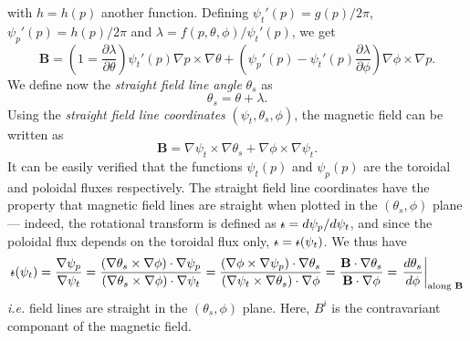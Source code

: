 with $h=h(p)$ another function. Defining $\psi_t'(p)=g(p)/2\pi$, $\psi_p'(p)=h(p)/2\pi$ and $\lambda=f(p,\theta,\phi)/\psi_t'(p)$, we get
\begin{equation}
	\mathbf{B} = \left(1=\frac{\partial\lambda}{\partial\theta}\right)\psi_t'(p)\nabla p\times\nabla\theta + \left(\psi_p'(p)-\psi_t'(p)\frac{\partial\lambda}{\partial\phi}\right)\nabla\phi\times\nabla p.
\end{equation}
We define now the \emph{straight field line angle} $\theta_s$ as 
\begin{equation}
	\theta_s = \theta + \lambda.
\end{equation}
Using the \emph{straight field line coordinates} $(\psi_t,\theta_s,\phi)$, the magnetic field can be written as
\begin{equation}
	\mathbf{B}=\nabla\psi_t\times\nabla\theta_s + \nabla\phi\times\nabla\psi_t. \label{eq.magnetic field covariant}
\end{equation}
It can be easily verified that the functions $\psi_t(p)$ and $\psi_p(p)$ are the toroidal and poloidal fluxes respectively. The straight field line coordinates have the property that magnetic field lines are straight when plotted in the $(\theta_s,\phi)$ plane --- indeed, the rotational transform is defined as $\text{$\iota\!\!$-}=d\psi_p/d\psi_t$, and since the poloidal flux depends on the toroidal flux only, $\text{$\iota\!\!$-}=\text{$\iota\!\!$-}(\psi_t)$. We thus have
\begin{equation}
	\text{$\iota\!\!$-}(\psi_t) = \frac{\nabla\psi_p}{\nabla\psi_t} = \frac{(\nabla\theta_s\times\nabla\phi)\cdot\nabla\psi_p}{(\nabla\theta_s\times\nabla\phi)\cdot\nabla\psi_t} = \frac{(\nabla\phi\times\nabla\psi_p)\cdot\nabla\theta_s}{(\nabla\psi_t\times\nabla\theta_s)\cdot\nabla\phi} = \frac{\mathbf{B}\cdot\nabla\theta_s}{\mathbf{B}\cdot\nabla\phi} = \left.\frac{d\theta_s}{d\phi}\right|_{\text{along }\mathbf{B}}
\end{equation}
\textit{i.e.} field lines are straight in the $(\theta_s,\phi)$ plane. Here, $B^i$ is the contravariant componant of the magnetic field.


